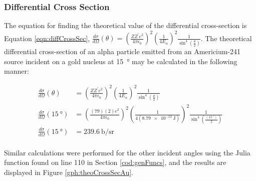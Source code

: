 \documentclass[a4paper]{article}
\begin{document}
\subsubsection{Differential Cross Section}

\qq The equation for finding the theoretical value of the differential
cross-section is Equation \ref{eqn:diffCrossSec},
\( \frac{d\sigma}{d\Omega} (\theta) = \left( \frac{Z Z^{\prime} e^2}{4 \pi
    \epsilon_0} \right)^2 \left( \frac{1}{4 E_{\alpha}} \right)^2
\frac{1}{\sin^4 \left( \frac{\theta}{2} \right)} \). The theoretical differential
cross-section of an alpha particle emitted from an Americium-241 source
incident on a gold nucleus at \SI{15}{\degree} may be calculated in the
following manner:

\begin{align*}
  \frac{d\sigma}{d\Omega} (\theta) &= \left( \frac{Z Z^{\prime} e^2}{4 \pi
                                     \epsilon_0} \right)^2 \left( \frac{1}{4 E_{\alpha}} \right)^2
                                     \frac{1}{\sin^4 \left( \frac{\theta}{2} \right)} \\
  \frac{d\sigma}{d\Omega} (\SI{15}{\degree}) 
                                   &= \left( \frac{(79) (2) e^2}{4 \pi \epsilon_0} \right)^2 
                                     \left( \frac{1}{4 (\SI{8.79e-13}{\joule})} \right)^2
                                     \frac{1}{\sin^4 \left( \frac{(\SI{15}{\degree})}{2} \right)} \\
  \frac{d\sigma}{d\Omega} (\SI{15}{\degree}) &=
                                               \SI{239.6}{\barn\per\steradian}
  \\
\end{align*}

Similar calculations were performed for the other incident angles using the
Julia function found on line 110 in Section \ref{cod:genFuncs}, and the
results are displayed in Figure \ref{gph:theoCrossSecAu}.
\end{document}
